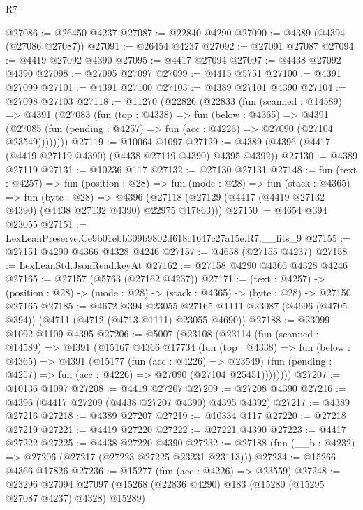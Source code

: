\begin{lexlean}{R7}
\begin{coremodule}
@27086 := @26450 @4237
@27087 := @22840 @4290
@27090 := @4389 (@4394 (@27086 @27087))
@27091 := @26454 @4237
@27092 := @27091 @27087
@27094 := @4419 @27092 @4390
@27095 := @4417 @27094
@27097 := @4438 @27092 @4390
@27098 := @27095 @27097
@27099 := @4415 @5751
@27100 := @4391 @27099
@27101 := @4391 @27100
@27103 := @4389 @27101 @4390
@27104 := @27098 @27103
@27118 := @11270
    (@22826
      (@22833
        (fun (scanned : @14589) =>
        @4391
          (@27083
            (fun (top : @4338) =>
            fun (below : @4365) =>
            @4391
              (@27085 (fun (pending : @4257) => fun (acc : @4226) => @27090 (@27104 @23549))))))))
@27119 := @10064 @1097
@27129 := @4389 (@4396 (@4417 (@4419 @27119 @4390) (@4438 @27119 @4390) @4395 @4392))
@27130 := @4389 @27119
@27131 := @10236 @117
@27132 := @27130 @27131
@27148 := fun (text : @4257) =>
  fun (position : @28) =>
  fun (mode : @28) =>
  fun (stack : @4365) =>
  fun (byte : @28) =>
  @4396 (@27118 (@27129 (@4417 (@4419 @27132 @4390) (@4438 @27132 @4390) @22975 @17863)))
@27150 := @4654 @394 @23055
@27151 := LexLeanPreserve.Ce9b01ebb309b9802d618c1647c27a15e.R7.__fits_9
@27155 := @27151 @4290 @4366 @4328 @4246
@27157 := @4658 (@27155 @4237)
@27158 := LexLeanStd.JsonRead.keyAt
@27162 := @27158 @4290 @4366 @4328 @4246
@27165 := @27157 (@5763 (@27162 @4237))
@27171 := (text : @4257) ->
  (position : @28) -> (mode : @28) -> (stack : @4365) -> (byte : @28) -> @27150 @27165
@27185 := @4672
    @394
    @23055
    @27165
    @1111
    @23087
    (@4696 (@4705 @394))
    (@4711 (@4712 (@4713 @1111) @23055 @4690))
@27188 := @23099 @1092 @1109 @4395
@27206 := @5007
    (@23108
      (@23114
        (fun (scanned : @14589) =>
        @4391
          (@15167
            @4366
            @17734
            (fun (top : @4338) =>
            fun (below : @4365) =>
            @4391
              (@15177
                (fun (acc : @4226) => @23549)
                (fun (pending : @4257) => fun (acc : @4226) => @27090 (@27104 @25451))))))))
@27207 := @10136 @1097
@27208 := @4419 @27207
@27209 := @27208 @4390
@27216 := @4396 (@4417 @27209 (@4438 @27207 @4390) @4395 @4392)
@27217 := @4389 @27216
@27218 := @4389 @27207
@27219 := @10334 @117
@27220 := @27218 @27219
@27221 := @4419 @27220
@27222 := @27221 @4390
@27223 := @4417 @27222
@27225 := @4438 @27220 @4390
@27232 := @27188 (fun (__b : @4232) => @27206 (@27217 (@27223 @27225 @23231 @23113)))
@27234 := @15266 @4366 @17826
@27236 := @15277 (fun (acc : @4226) => @23559)
@27248 := @23296
    @27094
    @27097
    (@15268 (@22836 @4290) @183 (@15280 (@15295 @27087 @4237) @4328) @15289)

\end{coremodule}
\end{lexlean}
